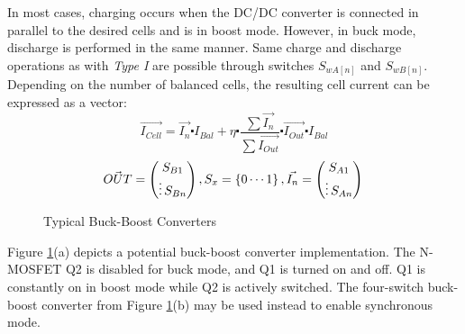 In most cases, charging occurs when the DC/DC converter is connected in parallel to the desired cells and is in boost mode. However, in buck mode, discharge is performed in the same manner. Same charge and discharge operations as with \textit{Type I} are possible through switches $S_{wA[n]}$ and $S_{wB[n]}$.
\\
Depending on the number of balanced cells, the resulting cell current can be expressed as a vector:
\begin{equation}\label{eq:Type2_cell_current}
    \vec{I_{Cell}}  = \vec{I_{n}} \centerdot I_{Bal}  + \eta \centerdot \frac{\sum \vec{I_{n}}}{\sum \vec{I_{Out}}}\centerdot \vec{I_{Out}} \centerdot I_{Bal}
\end{equation}
\begin{equation}
    \vec{OUT}  = \begin{pmatrix}
        S_{B1}\\
        \vdots
        S_{Bn}  
    \end{pmatrix} \\
    , S_{x}=\left\{0\cdots1\right\}\\
    , \vec{I_n}  = \begin{pmatrix}
        S_{A1}\\
        \vdots
        S_{An}
    \end{pmatrix} \\
\end{equation}

\begin{figure}[h]
	\centering
	\qquad
	\caption{Typical Buck-Boost Converters}
	\label{fig:Type2a Typical Buck boost}
\end{figure}
Figure \ref{fig:Type2a Typical Buck boost}(a) depicts a potential buck-boost converter implementation. The N-MOSFET Q2 is disabled for buck mode, and Q1 is turned on and off. Q1 is constantly on in boost mode while Q2 is actively switched. The four-switch buck-boost converter from Figure \ref{fig:Type2a Typical Buck boost}(b)  may be used instead to enable synchronous mode.

